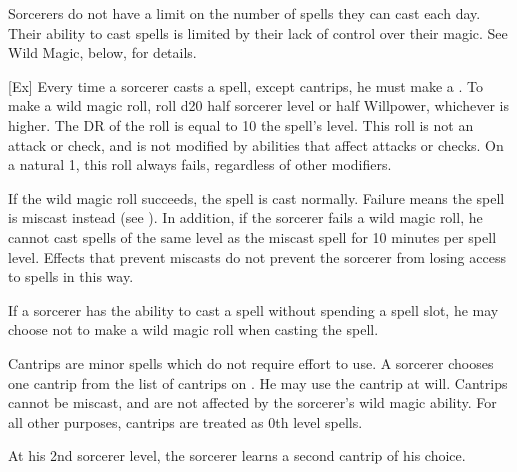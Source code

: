         Sorcerers do not have a limit on the number of spells they can cast each day.
        Their ability to cast spells is limited by their lack of control over their magic.
        See Wild Magic, below, for details.

        [Ex]\label{Wild Magic}
        Every time a sorcerer casts a spell, except cantrips, he must make a .
        To make a wild magic roll, roll d20 \add half sorcerer level or half Willpower, whichever is higher.
        The DR of the roll is equal to 10 \add the spell's level.
        This roll is not an attack or check, and is not modified by abilities that affect attacks or checks.
        On a natural 1, this roll always fails, regardless of other modifiers.

        If the wild magic roll succeeds, the spell is cast normally.
        Failure means the spell is miscast instead (see ).
        In addition, if the sorcerer fails a wild magic roll, he cannot cast spells of the same level as the miscast spell for 10 minutes per spell level.
        Effects that prevent miscasts do not prevent the sorcerer from losing access to spells in this way.

        If a sorcerer has the ability to cast a spell without spending a spell slot, he may choose not to make a wild magic roll when casting the spell.

        Cantrips are minor spells which do not require effort to use.
        A sorcerer chooses one cantrip from the list of cantrips on .
        He may use the cantrip at will.
        Cantrips cannot be miscast, and are not affected by the sorcerer's wild magic ability.
        For all other purposes, cantrips are treated as 0th level spells.

        At his 2nd sorcerer level, the sorcerer learns a second cantrip of his choice.

